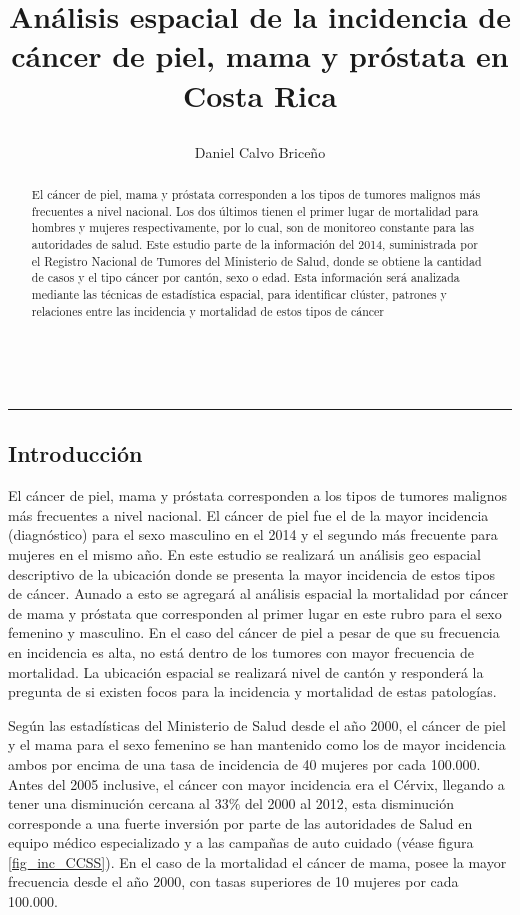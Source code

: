 \documentclass[12pt]{sciposter}
\author{Daniel Calvo Briceño}
\title{ \begin{Huge} 
Análisis espacial de la incidencia de cáncer de piel, mama y próstata en Costa Rica
\end{Huge}
}
\institute{Universidad de Costa Rica\\}
\begin{document}
\maketitle
\\
\rule{\textwidth}{2mm}

\begin{multicols}{2}

\begin{abstract}
El cáncer de piel, mama y próstata corresponden a los tipos de tumores malignos más frecuentes a nivel nacional. Los dos últimos tienen el primer lugar de mortalidad para hombres y mujeres respectivamente, por lo cual, son de monitoreo constante para las autoridades de salud. Este estudio parte de la información del 2014, suministrada por el Registro Nacional de Tumores del Ministerio de Salud, donde se obtiene la cantidad de casos y el tipo cáncer por cantón, sexo o edad. Esta información será analizada mediante las técnicas de estadística espacial, para identificar clúster, patrones y relaciones entre las incidencia y mortalidad de estos tipos de cáncer
\bigskip


\end{abstract}

\section{Introducción}

El cáncer de piel, mama y próstata corresponden a los tipos de tumores malignos más frecuentes a nivel nacional. El cáncer de piel fue el de la mayor incidencia (diagnóstico) para el sexo masculino en el 2014 y el segundo más frecuente para mujeres en el mismo año. En este estudio se realizará un análisis geo espacial descriptivo de la ubicación donde se presenta la mayor incidencia de estos tipos de cáncer. Aunado a esto se agregará al análisis espacial la mortalidad por cáncer de mama y próstata que corresponden al primer lugar en este rubro para el sexo femenino y masculino. En el caso del cáncer de piel a pesar de que su frecuencia en incidencia es alta, no está dentro de los tumores con mayor frecuencia de mortalidad. La ubicación espacial se realizará nivel de cantón y responderá la pregunta de si existen focos para la incidencia y mortalidad de estas patologías. 
 
\bigskip

Según las estadísticas del Ministerio de Salud desde el año 2000, el cáncer de piel y el mama para el sexo femenino se han mantenido como los de mayor incidencia ambos por encima de una tasa de incidencia de 40 mujeres por cada 100.000. Antes del 2005 inclusive, el cáncer con mayor incidencia era el Cérvix, llegando a tener una disminución cercana al $33\%$ del 2000 al 2012, esta disminución corresponde a una fuerte inversión por parte de las autoridades de Salud en equipo médico especializado y a las campañas de auto cuidado (véase figura \ref{fig_inc_CCSS}). En el caso de la mortalidad el cáncer de mama, posee la mayor frecuencia desde el año 2000, con tasas superiores de 10 mujeres por cada 100.000.


\end{multicols}
\end{document}
